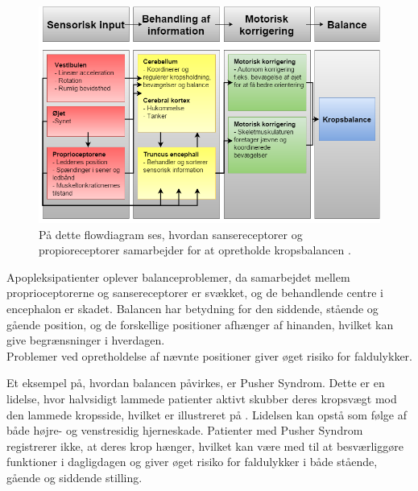 \begin{figure}[H]
	\centering
	\includegraphics[scale=0.55]{figures/bProblemanalyse/Balance-Flowdiagram.png}
	\caption{På dette flowdiagram ses, hvordan sansereceptorer og propioreceptorer samarbejder for at opretholde kropsbalancen \cite{watson2015}.}
	\label{flowbalance1}
\end{figure}

Apopleksipatienter oplever balanceproblemer, da samarbejdet mellem proprioceptorerne og sansereceptorer er svækket, og de behandlende centre i encephalon er skadet. \cite{Martini2012} Balancen har betydning for den siddende, stående og gående position, og de forskellige positioner afhænger af hinanden, hvilket kan give begrænsninger i hverdagen. \cite{Karnath2003} \\
Problemer ved opretholdelse af nævnte positioner giver øget risiko for faldulykker. \cite{Karnath2003} 

Et eksempel på, hvordan balancen påvirkes, er Pusher Syndrom. Dette er en lidelse, hvor halvsidigt lammede patienter aktivt skubber deres kropsvægt mod den lammede kropsside, hvilket er illustreret på . Lidelsen kan opstå som følge af både højre- og venstresidig hjerneskade. Patienter med Pusher Syndrom registrerer ikke, at deres krop hænger, hvilket kan være med til at besværliggøre funktioner i dagligdagen og giver øget risiko for faldulykker i både stående, gående og siddende stilling. \cite{Karnath2003} 

